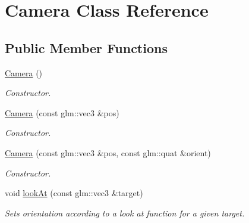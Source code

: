 \hypertarget{class_camera}{}\section{Camera Class Reference}
\label{class_camera}
\subsection*{Public Member Functions}
\begin{DoxyCompactItemize}
\item 
\mbox{\label{class_camera_a01f94c3543f56ede7af49dc778f19331}} 
\mbox{\hyperlink{class_camera_a01f94c3543f56ede7af49dc778f19331}{Camera}} ()
\begin{DoxyCompactList}\small\item\em Constructor. \end{DoxyCompactList}\item 
\mbox{\label{class_camera_acee2a1b3d56b0f141a3c6ee82735ed39}} 
\mbox{\hyperlink{class_camera_acee2a1b3d56b0f141a3c6ee82735ed39}{Camera}} (const glm\+::vec3 \&pos)
\begin{DoxyCompactList}\small\item\em Constructor. \end{DoxyCompactList}\item 
\mbox{\label{class_camera_a9e5dda23dca2ae363424f7a9025f55c9}} 
\mbox{\hyperlink{class_camera_a9e5dda23dca2ae363424f7a9025f55c9}{Camera}} (const glm\+::vec3 \&pos, const glm\+::quat \&orient)
\begin{DoxyCompactList}\small\item\em Constructor. \end{DoxyCompactList}\item 
\mbox{\label{class_camera_aec0442093303b9568a159f8c87f8b7d8}} 
void \mbox{\hyperlink{class_camera_aec0442093303b9568a159f8c87f8b7d8}{look\+At}} (const glm\+::vec3 \&target)
\begin{DoxyCompactList}\small\item\em Sets orientation according to a look at function for a given target. \end{DoxyCompactList}\item 
\mbox{\label{class_camera_a963fa4d081fe59425d6b939c4aa9853d}} 

\end{DoxyCompactItemize}

